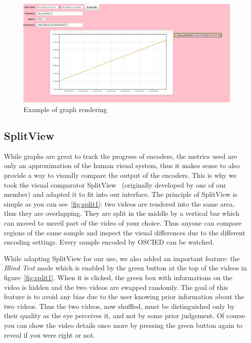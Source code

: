 \documentclass[a4paper,12pt]{article}
\begin{document}
\begin{figure}[!h] \centering
  \includegraphics[width=1\textwidth]{figures/graph1.png}
  \caption{Example of graph rendering}
  \label{fig:graph1}
\end{figure}

\subsection{SplitView}
While graphs are great to track the progress of encoders, the metrics used are
only an approximation of the human visual system, thus it makes sense to also
provide a way to visually compare the output of the encoders.
This is why we took the visual comparator SplitView~\cite{splitview}
(originally developed by one of our member) and adapted it to fit into our
interface.  The principle of SplitView is simple as you can
see~\ref{fig:split1}: two videos are rendered into the same area, thus they are
overlapping.  They are split in the middle by a vertical bar which can moved to
unveil part of the video of your choice.  Thus anyone can compare regions of the
same sample and inspect the visual differences due to the different encoding
settings. Every sample encoded by OSCIED can be watched.

While adapting SplitView for our use, we also added an important feature: the
\emph{Blind Test} mode which is enabled by the green button at the top of the
videos in figure~\ref{fig:split1}.  When it is clicked, the green box with
informations on the video is hidden and the two videos are swapped randomly. The goal
of this feature is to avoid any bias due to the user knowing prior information
about the two videos.  Thus the two videos, now shuffled, must be distinguished
only by their quality as the eye perceives it, and not by some prior judgement.
Of course you can show the video details once more by pressing the green button
again to reveal if you were right or not.
\end{document}
